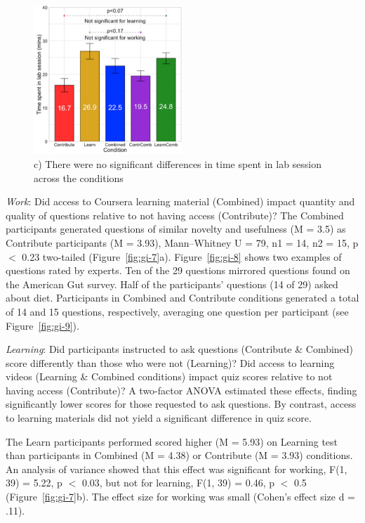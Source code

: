 \begin{figure}[h] 
  \centering
  \includegraphics[width=0.5\textwidth]{figures/gutinstinct/gi-7-1.png}
  \caption[Results: Time Spent]
{c) There were no significant differences in time spent in lab session across the conditions }
  \label{fig:gi-7-1}
\end{figure}

\textit{Work}: Did access to Coursera learning material (Combined) impact quantity and quality of questions relative to not having access (Contribute)? The Combined participants generated questions of similar novelty and usefulness (M = 3.5) as Contribute participants (M = 3.93), Mann–Whitney U = 79, n1 = 14, n2 = 15, p $<$ 0.23 two-tailed (Figure~\ref{fig:gi-7}a). Figure~\ref{fig:gi-8} shows two examples of questions rated by experts. Ten of the 29 questions mirrored questions found on the American Gut survey. Half of the participants’ questions (14 of 29) asked about diet. Participants in Combined and Contribute conditions generated a total of 14 and 15 questions, respectively, averaging one question per participant (see Figure~\ref{fig:gi-9}). 

\textit{Learning}: Did participants instructed to ask questions (Contribute \& Combined) score differently than those who were not (Learning)? Did access to learning videos (Learning \& Combined conditions) impact quiz scores relative to not having access (Contribute)? A two-factor ANOVA estimated these effects, finding significantly lower scores for those requested to ask questions. By contrast, access to learning materials did not yield a significant difference in quiz score.

The Learn participants performed scored higher (M = 5.93) on Learning test than participants in Combined (M = 4.38) or Contribute (M = 3.93) conditions. An analysis of variance showed that this effect was significant for working, F(1, 39) = 5.22, p $<$ 0.03, but not for learning, F(1, 39) = 0.46, p $<$ 0.5 (Figure~\ref{fig:gi-7}b). The effect size for working was small (Cohen’s effect size d = .11).

